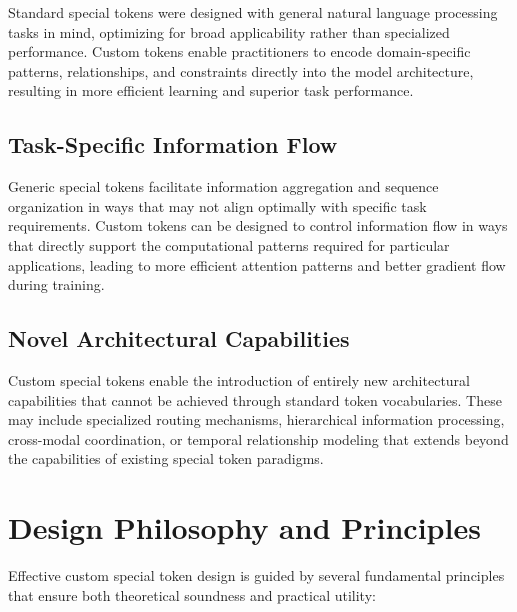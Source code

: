 Standard special tokens were designed with general natural language processing tasks in mind, optimizing for broad applicability rather than specialized performance. Custom tokens enable practitioners to encode domain-specific patterns, relationships, and constraints directly into the model architecture, resulting in more efficient learning and superior task performance.
\begin{comment}
Feedback: A concrete example would make this much stronger. For instance: "For example, a standard [SEP] token treats all boundaries equally, but in a legal document, the boundary between a 'clause' and a 'sub-clause' has a specific hierarchical meaning. A custom `<CLAUSE_END>` token can be trained to specifically capture this legal structure, leading to better document understanding."
\end{comment}

\subsection{Task-Specific Information Flow}

Generic special tokens facilitate information aggregation and sequence organization in ways that may not align optimally with specific task requirements. Custom tokens can be designed to control information flow in ways that directly support the computational patterns required for particular applications, leading to more efficient attention patterns and better gradient flow during training.

\subsection{Novel Architectural Capabilities}

Custom special tokens enable the introduction of entirely new architectural capabilities that cannot be achieved through standard token vocabularies. These may include specialized routing mechanisms, hierarchical information processing, cross-modal coordination, or temporal relationship modeling that extends beyond the capabilities of existing special token paradigms.

\section{Design Philosophy and Principles}

Effective custom special token design is guided by several fundamental principles that ensure both theoretical soundness and practical utility:

